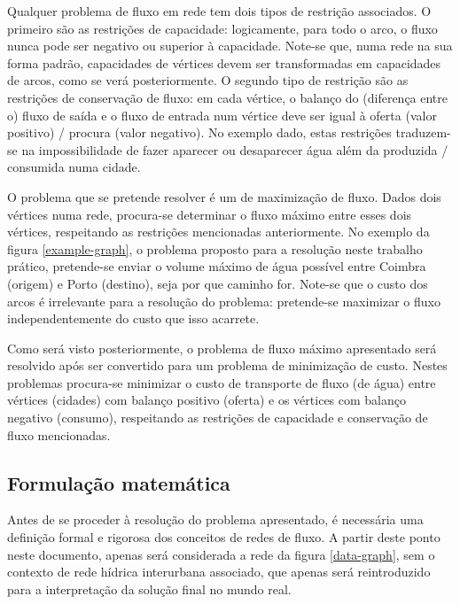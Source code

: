 \documentclass[12pt, a4paper, titlepage]{article}
\begin{document}
Qualquer problema de fluxo em rede tem dois tipos de restrição associados. O primeiro são as
restrições de capacidade: logicamente, para todo o arco, o fluxo nunca pode ser negativo ou superior
à capacidade. Note-se que, numa rede na sua forma padrão, capacidades de vértices devem ser
transformadas em capacidades de arcos, como se verá posteriormente. O segundo tipo de restrição são
as restrições de conservação de fluxo: em cada vértice, o balanço do (diferença entre o) fluxo de
saída e o fluxo de entrada num vértice deve ser igual à oferta (valor positivo) / procura (valor
negativo). No exemplo dado, estas restrições traduzem-se na impossibilidade de fazer aparecer ou
desaparecer água além da produzida / consumida numa cidade.


O problema que se pretende resolver é um de maximização de fluxo. Dados dois vértices numa rede,
procura-se determinar o fluxo máximo entre esses dois vértices, respeitando as restrições
mencionadas anteriormente. No exemplo da figura \ref{example-graph}, o problema proposto para a
resolução neste trabalho prático, pretende-se enviar o volume máximo de água possível entre Coimbra
(origem) e Porto (destino), seja por que caminho for. Note-se que o custo dos arcos é irrelevante
para a resolução do problema: pretende-se maximizar o fluxo independentemente do custo que isso
acarrete.

Como será visto posteriormente, o problema de fluxo máximo apresentado será resolvido após ser
convertido para um problema de minimização de custo. Nestes problemas procura-se minimizar o custo
de transporte de fluxo (de água) entre vértices (cidades) com balanço positivo (oferta) e os
vértices com balanço negativo (consumo), respeitando as restrições de capacidade e conservação de
fluxo mencionadas.

\subsection{Formulação matemática}

Antes de se proceder à resolução do problema apresentado, é necessária uma definição formal e
rigorosa dos conceitos de redes de fluxo. A partir deste ponto neste documento, apenas será
considerada a rede da figura \ref{data-graph}, sem o contexto de rede hídrica interurbana associado,
que apenas será reintroduzido para a interpretação da solução final no mundo real.
\end{document}

